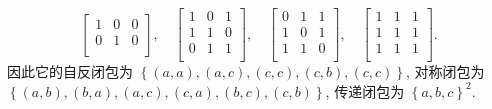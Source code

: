 \documentclass[10pt,UTF8]{book} %
\begin{document}
\begin{exercise}
\[\begin{bmatrix}
        1 & 0 & 0 \\
        0 & 1 & 0 \\
    \end{bmatrix},
    \quad
    \begin{bmatrix}
        1 & 0 & 1 \\
        1 & 1 & 0 \\
        0 & 1 & 1 \\
    \end{bmatrix},
    \quad
    \begin{bmatrix}
        0 & 1 & 1 \\
        1 & 0 & 1 \\
        1 & 1 & 0 \\
    \end{bmatrix},
    \quad
    \begin{bmatrix}
        1 & 1 & 1 \\
        1 & 1 & 1 \\
        1 & 1 & 1 \\
    \end{bmatrix}. \]
    因此它的自反闭包为 $\left\{ (a,a), (a,c), (c,c), (c,b), (c,c) \right\}$, 
    对称闭包为 $\left\{(a,b), (b,a), (a,c), (c,a), (b,c), (c,b) \right\}$, 
    传递闭包为 $\left\{a,b,c\right\}^2$.
\end{exercise}
\end{document}
